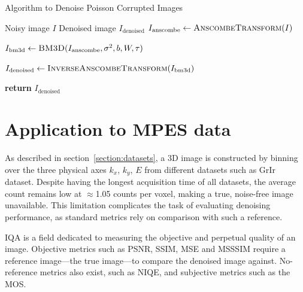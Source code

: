 \begin{algorithm}
    \caption{Algorithm to Denoise Poisson Corrupted Images}\label{alg:anscombe-bm3d}
    \begin{algorithmic}[1]
    \Require Noisy image $I$
    \Ensure Denoised image $I_{\text{denoised}}$
    \Statex
        \State $I_{\text{anscombe}} \gets \textsc{AnscombeTransform}(I)$
        
        \State $I_{\text{bm3d}} \gets \textsc{BM3D}(I_{\text{anscombe}}, \sigma^2, b, W, \tau)$
        
        \State $I_{\text{denoised}} \gets \textsc{InverseAnscombeTransform}(I_{\text{bm3d}})$
        
        \State \textbf{return} $I_{\text{denoised}}$
    \EndProcedure
    \end{algorithmic}
\end{algorithm}

\section{Application to MPES data}
As described in section~\ref{section:datasets}, a 3D image is constructed by binning over the three physical axes $k_x$, $k_y$, $E$ from different datasets such as \gls{GrIr} dataset. Despite having the longest acquisition time of all datasets, the average count remains low at $\approx$1.05 counts per voxel, making a true, noise-free image unavailable. This limitation complicates the task of evaluating denoising performance, as standard metrics rely on comparison with such a reference.

\gls{IQA} is a field dedicated to measuring the objective and perpetual quality of an image. Objective metrics such as \gls{PSNR}, \gls{SSIM}, \gls{MSE} and \gls{MSSSIM} require a reference image---the true image---to compare the denoised image against. No-reference metrics also exist, such as \gls{NIQE}, and subjective metrics such as the \gls{MOS}.

